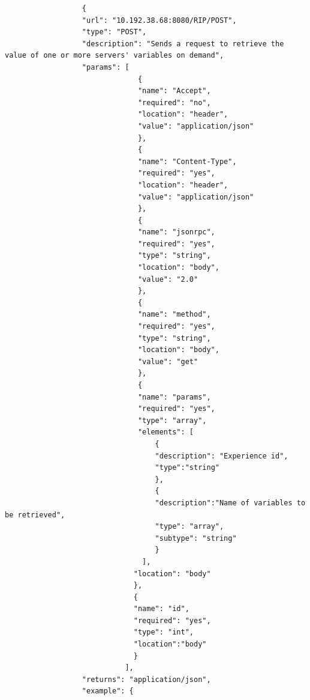 \begin{lstlisting}
                  {
                  "url": "10.192.38.68:8080/RIP/POST",
                  "type": "POST",
                  "description": "Sends a request to retrieve the value of one or more servers' variables on demand",
                  "params": [
                               {
                               "name": "Accept",
                               "required": "no",
                               "location": "header",
                               "value": "application/json"
                               },
                               {
                               "name": "Content-Type",
                               "required": "yes",
                               "location": "header",
                               "value": "application/json"
                               },
                               {
                               "name": "jsonrpc",
                               "required": "yes",
                               "type": "string",
                               "location": "body",
                               "value": "2.0"
                               },
                               {
                               "name": "method",
                               "required": "yes",
                               "type": "string",
                               "location": "body",
                               "value": "get"
                               },
                               {
                               "name": "params",
                               "required": "yes",
                               "type": "array",
                               "elements": [
                                   {
                                   "description": "Experience id",
                                   "type":"string"
                                   },
                                   {
                                   "description":"Name of variables to be retrieved",
                                   "type": "array",
                                   "subtype": "string"
                                   }
                                ],
                              "location": "body"
                              },
                              {
                              "name": "id",
                              "required": "yes",
                              "type": "int",
                              "location":"body"
                              }
                            ],
                  "returns": "application/json",
                  "example": {

\end{lstlisting}

